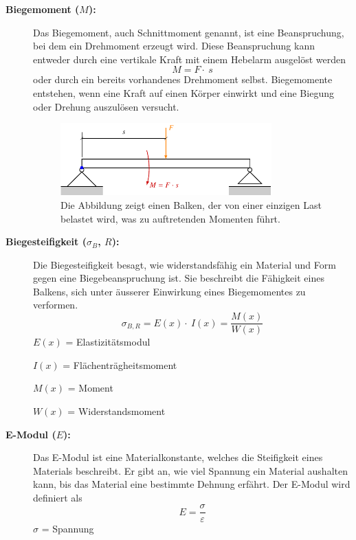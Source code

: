 \begin{description}
\item[\textbf{Biegemoment ($M$):}] Das Biegemoment, auch Schnittmoment genannt, ist eine Beanspruchung, bei dem ein Drehmoment erzeugt wird.
Diese Beanspruchung kann entweder durch eine vertikale Kraft mit einem Hebelarm ausgelöst werden
\begin{equation}
	M=
	F\cdot\ s
\end{equation}
oder durch ein bereits vorhandenes Drehmoment selbst.
Biegemomente entstehen, wenn eine Kraft auf einen Körper einwirkt und eine Biegung oder Drehung auszulösen versucht.
\begin{figure}
	\centering
	\includegraphics[width=0.8\textwidth]{papers/balken/images/teil1/Biegemoment.pdf}
	\caption{Die Abbildung zeigt einen Balken, der von einer einzigen Last belastet wird, was zu auftretenden Momenten führt.}
	\label{fig:Die Abbildung zeigt einen Balken, der von einer einzigen Last belastet wird, was zu auftretenden Momenten führt.}
\end{figure}

\item[\textbf{Biegesteifigkeit ($σ_B$, $R$):}] Die Biegesteifigkeit besagt, wie widerstandsfähig ein Material und Form gegen eine Biegebeanspruchung ist.
Sie beschreibt die Fähigkeit eines Balkens, sich unter äusserer Einwirkung eines Biegemomentes zu verformen.
\begin{equation}
\sigma_{B,R}=E
\left(x\right)\cdot\ I\left(x\right)=
\frac{M(x)}{W(x)}
\end{equation}
$E(x)$ = Elastizitätsmodul

$I(x)$ = Flächenträgheitsmoment

$M(x)$ = Moment 

$W(x)$ = Widerstandsmoment

\item[\textbf{E-Modul ($E$):}] Das E-Modul ist eine Materialkonstante, welches die Steifigkeit eines Materials beschreibt.
Er gibt an, wie viel Spannung ein Material aushalten kann, bis das Material eine bestimmte Dehnung erfährt. \cite{balken:Elastizitaetsmodul}
Der E-Modul wird definiert als
\begin{equation}
E=
\frac{\sigma}{\varepsilon}
\end{equation}
$σ$ = Spannung


\end{description}
